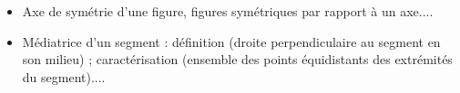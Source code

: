 \begin{prerequis}    
    \begin{itemize}
        \item[\emoji{diamond-suit}] Axe de symétrie d’une figure, figures symétriques par rapport à un axe....
        \columnbreak
        \item[\emoji{diamond-suit}] Médiatrice d’un segment : définition (droite perpendiculaire au segment en son milieu) ; caractérisation (ensemble des points équidistants des extrémités du segment)....
    \end{itemize}
\end{prerequis}